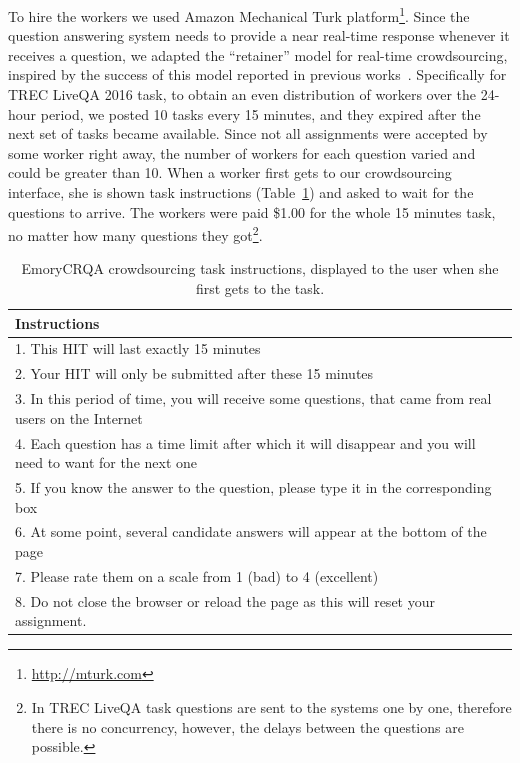 To hire the workers we used Amazon Mechanical Turk platform\footnote{\href{url}{http://mturk.com}}.
Since the question answering system needs to provide a near real-time response whenever it receives a question, we adapted the ``retainer'' model for real-time crowdsourcing, inspired by the success of this model reported in previous works~\cite{bernstein2011crowds,bigham2010vizwiz}.
Specifically for TREC LiveQA 2016 task, to obtain an even distribution of workers over the 24-hour period, we posted 10 tasks every 15 minutes, and they expired after the next set of tasks became available.
Since not all assignments were accepted by some worker right away, the number of workers for each question varied and could be greater than 10.
When a worker first gets to our crowdsourcing interface, she is shown task instructions (Table~\ref{table:non-factoid:crowdsourcing:crqa:crowd_instructions}) and asked to wait for the questions to arrive.
The workers were paid \$1.00 for the whole 15 minutes task, no matter how many questions they got\footnote{In TREC LiveQA task questions are sent to the systems one by one, therefore there is no concurrency, however, the delays between the questions are possible.}.

\begin{table}[ht]
\centering
\begin{tabular}{p{13cm}}
\textbf{Instructions} \\
\hline
1. This HIT will last exactly 15 minutes\\
2. Your HIT will only be submitted after these 15 minutes\\
3. In this period of time, you will receive some questions, that came from real users on the Internet\\
4. Each question has a time limit after which it will disappear and you will need to want for the next one\\
5. If you know the answer to the question, please type it in the corresponding box\\
6. At some point, several candidate answers will appear at the bottom of the page\\
7. Please rate them on a scale from 1 (bad) to 4 (excellent)\\
8. Do not close the browser or reload the page as this will reset your assignment.\\
\end{tabular}
\caption{EmoryCRQA crowdsourcing task instructions, displayed to the user when she first gets to the task.}
\label{table:non-factoid:crowdsourcing:crqa:crowd_instructions}
\end{table}

